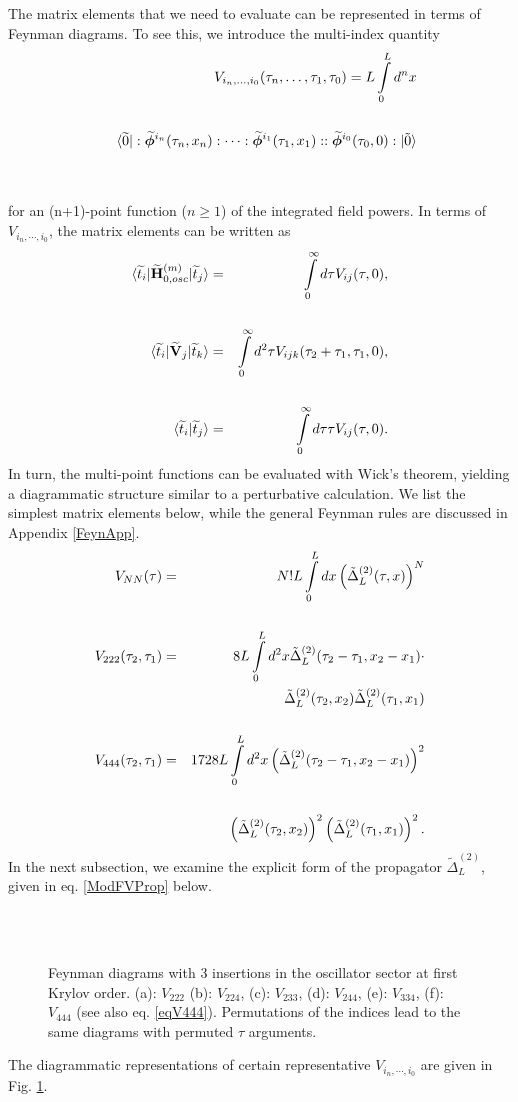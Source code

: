 \documentclass[twocolumn,secnumarabic,amssymb, nobibnotes, aps, prd]{revtex4-2}
\newcommand{\bea}{\begin{eqnarray}}
\newcommand{\eea}{\end{eqnarray}}
\begin{document}
The matrix elements that we need to evaluate can be represented in terms of Feynman diagrams.  To see this, we
introduce the multi-index quantity
\bea
&&V_{i_n,\dots,i_0}(\tau_n,\dots,\tau_1,\tau_0)=L\intop_{0}^L d^nx\cr\cr
&&\braket{\widetilde{0}|:\widetilde{\boldsymbol\phi}^{i_n}(\tau_n,x_n):\dots  :\widetilde{\boldsymbol\phi}^{i_1}(\tau_1,x_1)::\widetilde{\boldsymbol\phi}^{i_0}(\tau_0,0):|\tilde{0}}\cr\cr\label{multiV}
&&
\eea
for an (n+1)-point function ($n\geq1$) of the integrated field powers.  In terms of $V_{i_n,\cdots,i_0}$,
the matrix elements can be written as
\bea
\braket{\widetilde t_{i}|\widetilde{\mathbf H}_{0,osc}^{(m)}|\widetilde t_{j}}&=&\intop_0^\infty d\tau V_{ij}(\tau,0),\cr\cr
\braket{\widetilde t_{i}|\widetilde{\mathbf V}_j|\widetilde t_{k}}&=&\intop_0^\infty d^2\tau V_{ijk}(\tau_2+\tau_1,\tau_1,0),\cr\cr
\braket{\widetilde t_{i}|\widetilde t_{j}}&=&\intop_0^\infty d\tau \tau V_{ij}(\tau,0).
\eea
In turn, the multi-point functions can be evaluated with Wick's theorem, yielding a diagrammatic structure similar to a perturbative calculation.  
We list the simplest matrix elements below, while the general Feynman rules are discussed in Appendix \ref{FeynApp}.
\bea
V_{NN}(\tau)&=&N! L\intop_0^L dx \left(\tilde \Delta^{(2)}_{L}(\tau,x)\right)^N\cr\cr
V_{222}(\tau_2,\tau_1)&=&8  L\intop_0^L d^2x \tilde \Delta^{(2)}_{L}(\tau_2-\tau_1,x_2-x_1)\cdot\nonumber\\
&&\tilde \Delta^{(2)}_{L}(\tau_2,x_2)\tilde \Delta^{(2)}_{L}(\tau_1,x_1)\cr\cr
V_{444}(\tau_2,\tau_1)&=&1728  L\intop_0^L d^2x \left(\tilde \Delta^{(2)}_{L}(\tau_2-\tau_1,x_2-x_1)\right)^2\cr\cr
&&\left(\tilde \Delta^{(2)}_{L}(\tau_2,x_2)\right)^2\left(\tilde \Delta^{(2)}_{L}(\tau_1,x_1)\right)^2 .\label{eqV444}
\eea
In the next subsection, we examine the explicit form of the propagator $\tilde{\Delta}^{(2)}_L$, given in eq. \eqref{ModFVProp} below.
\begin{figure}[]
    \centering
 \\
 \\

    \caption{Feynman diagrams with 3 insertions in the oscillator sector at first Krylov order. (a): $V_{222}$  (b):  $V_{224}$, (c): $V_{233}$, (d): $V_{244}$, (e): $V_{334}$, (f): $V_{444}$ (see also eq. \eqref{eqV444}). Permutations of the indices lead to the same diagrams with permuted $\tau$ arguments.}
    \label{FigFeynNLO}
\end{figure}
The diagrammatic representations of certain representative $V_{i_n,\cdots,i_0}$ are given in Fig. \ref{FigFeynNLO}.
\end{document}
